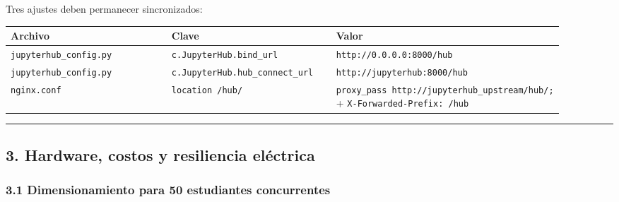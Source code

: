 \documentclass[11pt,a4paper]{article}
\begin{document}
Tres ajustes deben permanecer sincronizados:

\begin{longtable}[]{@{}p{0.302\linewidth}p{0.302\linewidth}p{0.302\linewidth}@{}}
\toprule
Archivo & Clave & Valor \\
\midrule
\endhead
\texttt{jupyterhub\_\allowbreak{}config.\allowbreak{}py} & \texttt{c.\allowbreak{}JupyterHub.\allowbreak{}bind\_\allowbreak{}url} & \texttt{http:\allowbreak{}/\allowbreak{}/\allowbreak{}0.\allowbreak{}0.\allowbreak{}0.\allowbreak{}0:\allowbreak{}8000/\allowbreak{}hub} \\
\texttt{jupyterhub\_\allowbreak{}config.\allowbreak{}py} & \texttt{c.\allowbreak{}JupyterHub.\allowbreak{}hub\_\allowbreak{}connect\_\allowbreak{}url} & \texttt{http:\allowbreak{}/\allowbreak{}/\allowbreak{}jupyterhub:\allowbreak{}8000/\allowbreak{}hub} \\
\texttt{nginx.\allowbreak{}conf} & \texttt{location\ /\allowbreak{}hub/\allowbreak{}} & \texttt{proxy\_\allowbreak{}pass\ http:\allowbreak{}/\allowbreak{}/\allowbreak{}jupyterhub\_\allowbreak{}upstream/\allowbreak{}hub/\allowbreak{};} + \texttt{X-\allowbreak{}Forwarded-\allowbreak{}Prefix:\allowbreak{}\ /\allowbreak{}hub} \\
\bottomrule
\end{longtable}

\begin{center}\rule{0.5\linewidth}{0.5pt}\end{center}

\hypertarget{3-hardware-costos-y-resiliencia-eluxe9ctrica}{%
\subsection{3. Hardware, costos y resiliencia eléctrica}\label{3-hardware-costos-y-resiliencia-eluxe9ctrica}}

\hypertarget{31-dimensionamiento-para-50-estudiantes-concurrentes}{%
\subsubsection{3.1 Dimensionamiento para 50 estudiantes concurrentes}\label{31-dimensionamiento-para-50-estudiantes-concurrentes}}
\end{document}

